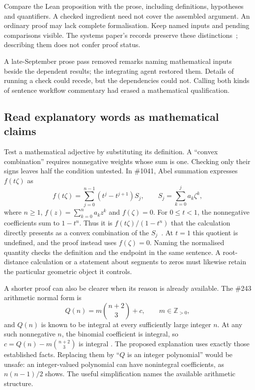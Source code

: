 Compare the Lean proposition with the prose, including definitions,
hypotheses and quantifiers. A checked ingredient need not cover the assembled
argument. An ordinary proof may lack complete formalisation. Keep named inputs
and pending comparisons visible. The systems paper's records preserve these
distinctions~\cite{systems}; describing them does not confer proof status.

A late-September prose pass removed remarks naming mathematical inputs beside
the dependent results; the integrating agent restored them. Details of running
a check could recede, but the dependencies could not. Calling both kinds of
sentence workflow commentary had erased a mathematical qualification.

\subsection{Read explanatory words as mathematical claims}\label{sec:words-as-claims}

Test a mathematical adjective by substituting its definition. A ``convex
combination'' requires nonnegative weights whose sum is one. Checking only
their signs leaves half the condition untested. In \#1041, Abel summation
expresses $f(t\zeta)$ as
\[
 f(t\zeta)=\sum_{j=0}^{n-1}(t^j-t^{j+1})S_j,
 \qquad S_j=\sum_{k=0}^{j}a_k\zeta^k,
\]
where $n\ge1$, $f(z)=\sum_{k=0}^n a_kz^k$ and $f(\zeta)=0$.
For $0\le t<1$, the nonnegative coefficients sum to $1-t^n$.
Thus it is $f(t\zeta)/(1-t^n)$ that the calculation directly presents as a
convex combination of the $S_j$~\cite[section on trinomials]{paper1041}.
At $t=1$ this quotient is undefined, and the proof instead uses $f(\zeta)=0$.
Naming the normalised quantity checks the definition and the endpoint in the
same sentence. A root-distance calculation or a statement about segments to
zeros must likewise retain the particular geometric object it controls.

A shorter proof can also be clearer when its reason is already available.
The \#243 arithmetic normal form is
\[
                 Q(n)=m\binom{n+2}{3}+c,
                 \qquad m\in\mathbb Z_{>0},
\]
and $Q(n)$ is known to be integral at every sufficiently large integer $n$.
At any such nonnegative $n$, the binomial coefficient is integral, so
$c=Q(n)-m\binom{n+2}{3}$ is integral
\cite[reduction and the constant term]{paper243}.
The proposed explanation uses exactly those established facts. Replacing them
by ``$Q$ is an integer polynomial'' would be unsafe: an integer-valued polynomial
can have nonintegral coefficients, as $n(n-1)/2$ shows. The useful simplification
names the available arithmetic structure.

